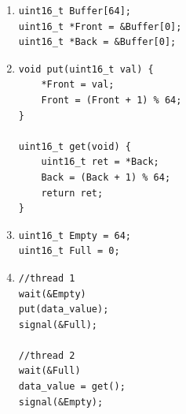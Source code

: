 \documentclass{jhwhw}
\begin{document}
\problem{}
\begin{enumerate}
\item \begin{verbatim}
uint16_t Buffer[64];
uint16_t *Front = &Buffer[0];
uint16_t *Back = &Buffer[0];
\end{verbatim}
\item \begin{verbatim}
void put(uint16_t val) {
    *Front = val;
    Front = (Front + 1) % 64;
}

uint16_t get(void) {
    uint16_t ret = *Back;
    Back = (Back + 1) % 64;
    return ret;
}
\end{verbatim}
\item \begin{verbatim}
uint16_t Empty = 64;
uint16_t Full = 0;
\end{verbatim}
\item \begin{verbatim}
//thread 1
wait(&Empty)
put(data_value);
signal(&Full);

//thread 2
wait(&Full)
data_value = get();
signal(&Empty);
\end{verbatim}
\end{enumerate}
\end{document}
